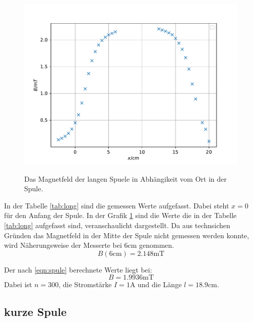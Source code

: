 \begin{figure}
  \centering
  \caption{Das Magnetfeld der langen Spuele in Abhängikeit vom Ort in der Spule.}
  \includegraphics[width=\textwidth]{content/data/plot_long.pdf}
  \label{fig:long}
\end{figure}

\FloatBarrier
In der Tabelle \ref{tab:long} sind die gemessen Werte aufgefasst.
Dabei steht $x=0$ für den Anfang der Spule.
In der Grafik \ref{fig:long} sind die Werte die in der Tabelle \ref{tab:long} aufgefasst sind, veranschaulicht dargestellt.
Da aus technsichen Gründen das Magnetfeld in der Mitte der Spule nicht gemessen werden konnte, wird Näherungsweise der Messerte bei $6 \si{\centi\meter}$ genommen.
\begin{equation*}
  B(6\si{\centi\meter}) = 2.148 \si{\milli\tesla} 
\end{equation*}

Der nach \eqref{eqn:spule} berechnete Werte liegt bei:
\begin{equation*}
  B = 1.9936 \si{\milli\tesla} 
\end{equation*}
Dabei ist $n=300$, die Stromstärke $I=1\si{\ampere}$ und die Länge $l=18.9 \si{\centi\meter}$.

\FloatBarrier
\subsection{kurze Spule}

